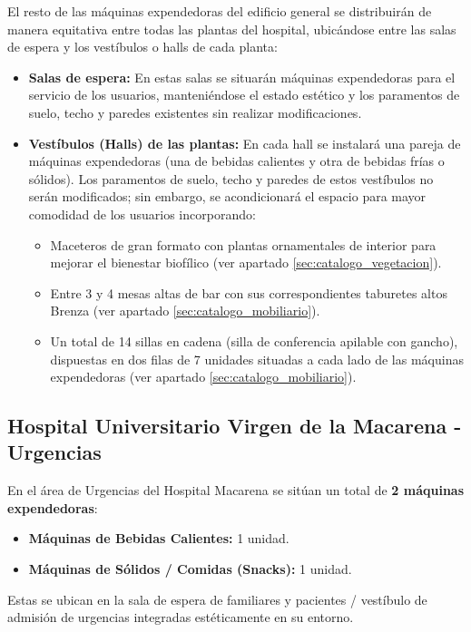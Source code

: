 \documentclass[12pt,a4paper]{article}
\newcommand{\todo}[1]{#1}
\begin{document}
El resto de las máquinas expendedoras del edificio general se distribuirán de manera equitativa entre todas las plantas del hospital, ubicándose entre las salas de espera y los vestíbulos o halls de cada planta:
\begin{itemize}
    \item \textbf{Salas de espera:} En estas salas se situarán máquinas expendedoras para el servicio de los usuarios, manteniéndose el estado estético y los paramentos de suelo, techo y paredes existentes sin realizar modificaciones.
    \item \textbf{Vestíbulos (Halls) de las plantas:} En cada hall se instalará una pareja de máquinas expendedoras (una de bebidas calientes y otra de bebidas frías o sólidos). Los paramentos de suelo, techo y paredes de estos vestíbulos no serán modificados; sin embargo, se acondicionará el espacio para mayor comodidad de los usuarios incorporando:
    \begin{itemize}
        \item Maceteros de gran formato con plantas ornamentales de interior para mejorar el bienestar biofílico (ver apartado \ref{sec:catalogo_vegetacion}).
        \item Entre 3 y 4 mesas altas de bar con sus correspondientes taburetes altos Brenza (ver apartado \ref{sec:catalogo_mobiliario}).
        \item Un total de 14 sillas en cadena (silla de conferencia apilable con gancho), dispuestas en dos filas de 7 unidades situadas a cada lado de las máquinas expendedoras (ver apartado \ref{sec:catalogo_mobiliario}).
    \end{itemize}
\end{itemize}

\subsection{Hospital Universitario Virgen de la Macarena - Urgencias}
En el área de Urgencias del Hospital Macarena se sitúan un total de \textbf{2 máquinas expendedoras}:
\begin{itemize}
    \item \textbf{Máquinas de Bebidas Calientes:} 1 unidad.
    \item \textbf{Máquinas de Sólidos / Comidas (Snacks):} 1 unidad.
\end{itemize}

\todo{Estas se ubican en la sala de espera de familiares y pacientes / vestíbulo de admisión de urgencias integradas estéticamente en su entorno.}
\end{document}
